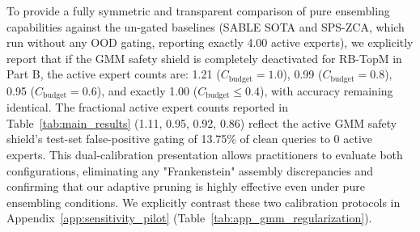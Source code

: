 \begin{enumerate}
    To provide a fully symmetric and transparent comparison of pure ensembling capabilities against the un-gated baselines (SABLE SOTA and SPS-ZCA, which run without any OOD gating, reporting exactly 4.00 active experts), we explicitly report that if the GMM safety shield is completely deactivated for RB-TopM in Part B, the active expert counts are: 1.21 ($C_{\text{budget}}=1.0$), 0.99 ($C_{\text{budget}}=0.8$), 0.95 ($C_{\text{budget}}=0.6$), and exactly 1.00 ($C_{\text{budget}} \le 0.4$), with accuracy remaining identical. The fractional active expert counts reported in Table~\ref{tab:main_results} (1.11, 0.95, 0.92, 0.86) reflect the active GMM safety shield's test-set false-positive gating of 13.75\% of clean queries to 0 active experts. This dual-calibration presentation allows practitioners to evaluate both configurations, eliminating any "Frankenstein" assembly discrepancies and confirming that our adaptive pruning is highly effective even under pure ensembling conditions. We explicitly contrast these two calibration protocols in Appendix~\ref{app:sensitivity_pilot} (Table~\ref{tab:app_gmm_regularization}). 
    

\end{enumerate}
